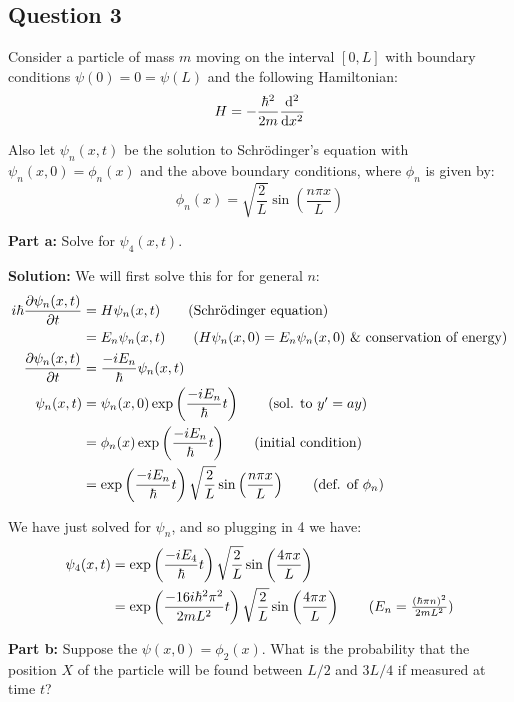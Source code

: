 \documentclass{article}
\begin{document}
\subsection*{Question 3}
Consider a particle of mass $m$ moving on the interval $[0,L]$ with boundary conditions $\psi(0)=0=\psi(L)$ and the following Hamiltonian:
$$H=-\frac{\hbar^2}{2m}\dv[2]{x}$$

Also let $\psi_n(x,t)$ be the solution to Schrödinger's equation with $\psi_n(x,0)=\phi_n(x)$ and the above boundary conditions, where $\phi_n$ is given by:
$$\phi_n(x)=\sqrt{\frac{2}{L}}\sin\left(\frac{n\pi x}{L}\right)$$
\bigskip

\noindent\textbf{Part a:} Solve for $\psi_4(x,t)$.
\bigskip

\noindent\textbf{Solution:} We will first solve this for for general $n$:
\begin{align*}
    i\hbar\pdv{\psi_n(x,t)}{t}&=H\psi_n(x,t)\tag{Schrödinger equation}\\
    &=E_n\psi_n(x,t)\tag{$H\psi_n(x,0)=E_n\psi_n(x,0)$ \& conservation of energy}\\
    \pdv{\psi_n(x,t)}{t}&=\frac{-iE_n}{\hbar}\psi_n(x,t)\\
    \psi_n(x,t)&=\psi_n(x,0)\exp\left(\frac{-iE_n}{\hbar}t\right)\tag{sol. to $y'=ay$}\\
    &=\phi_n(x)\exp\left(\frac{-iE_n}{\hbar}t\right)\tag{initial condition}\\
    &=\exp\left(\frac{-iE_n}{\hbar}t\right)\sqrt{\frac{2}{L}}\sin\left(\frac{n\pi x}{L}\right)\tag{def. of $\phi_n$}
\end{align*}

We have just solved for $\psi_n$, and so plugging in 4 we have:
\begin{align*}
    \psi_4(x,t)&=\exp\left(\frac{-iE_4}{\hbar}t\right)\sqrt{\frac{2}{L}}\sin\left(\frac{4\pi x}{L}\right)\\
    &=\exp\left(\frac{-16i\hbar^2\pi^2}{2mL^2}t\right)\sqrt{\frac{2}{L}}\sin\left(\frac{4\pi x}{L}\right)\tag{$E_n=\frac{(\hbar\pi n)^2}{2mL^2}$}
\end{align*}
\bigskip

\noindent\textbf{Part b:} Suppose the $\psi(x,0)=\phi_2(x)$. What is the probability that the position $X$ of the particle will be found between $L/2$ and $3L/4$ if measured at time $t$?
\bigskip
\end{document}
